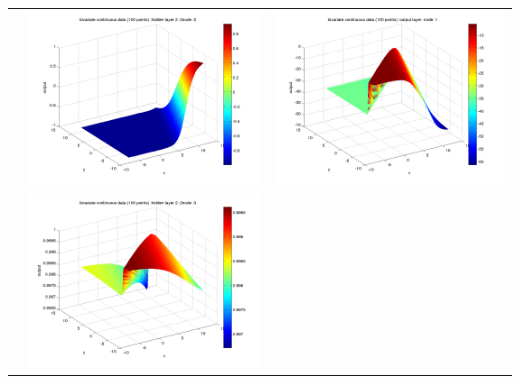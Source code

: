 \documentclass[fleqn]{article}
\begin{document}
\begin{center}
\begin{longtable}{ c | c | r }
     																		&   \includegraphics[scale=0.25]{./pics/bivariate100/_2_4/_2_4_epoch_10_hidden layer 2 :22}  & \includegraphics[scale=0.25]{./pics/bivariate100/_2_4/_2_4_epoch_10_output layer :1}  \\ 
     																		&   \includegraphics[scale=0.25]{./pics/bivariate100/_2_4/_2_4_epoch_10_hidden layer 2 :23} &  \\

\end{longtable}
\end{center}
\end{document}
